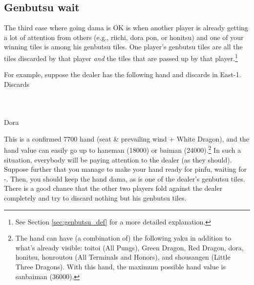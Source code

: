 \newpage
\subsection{{\jap Genbutsu} wait}  \label{sec:genbutsu}
The third case where going {\jap dama} is OK is when another player is already getting a lot of attention from others (e.g., riichi, {\jap dora} {\jap pon}, or {\jap honitsu}) and one of your winning tiles is among his {\jap genbutsu} tiles.
One player's {\jap genbutsu} tiles are all the tiles discarded by that player \emph{and} the tiles that are passed up by that player.\footnote{See Section \ref{sec:genbutsu_def} for a more detailed explanation.}

\bigskip
For example, suppose the dealer has the following hand and discards in East-1. 
\bp
\vspace{-20pt}
{\small Discards}\\ \vspace{-10pt}
\xi{}\\
\vspace{-10pt}
\hspace{-35pt}\\
\vspace{-10pt}
\ep
\bp
{}
\rbai\bai\bai~~\dong\dong\rdong~~\\
\hfill\footnotesize{{\jap Dora}~~~~~}
\ep

This is a confirmed 7700 hand (seat \& prevailing wind + White \linebreak Dragon), and the hand value can easily go up to {\jap haneman} (18000) or {\jap baiman} (24000).\footnote{The hand can have (a combination of) the following {\jap yaku} in addition to what's already visible: {\jap toitoi} (All Pungs), Green Dragon, Red Dragon, {\jap dora}, {\jap honitsu}, {\jap honroutou} (All Terminals and Honors), and {\jap shousangen} (Little Three Dragons). With this hand, the maximum possible hand value is {\jap sanbaiman} (36000).} 
In such a situation, everybody will be paying attention to the dealer (as they should). Suppose further that you manage to make your hand ready for {\jap pinfu}, waiting for {\LARGE{}-}. Then, you should keep the hand {\jap dama}, as {\LARGE{}} is one of the dealer's {\jap genbutsu} tiles. There is a good chance that the other two players fold against the dealer completely and try to discard nothing but his {\jap genbutsu} tiles. 

